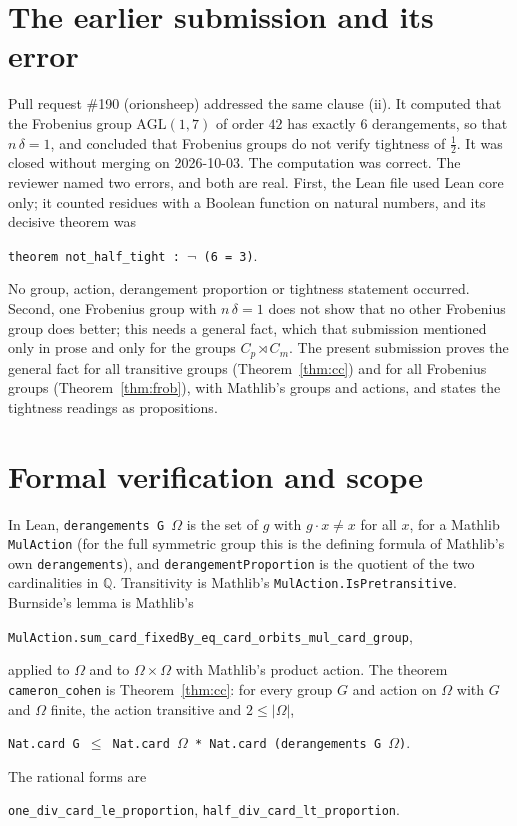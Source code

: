 \documentclass[11pt]{article}
\theoremstyle{remark}
\begin{document}
\section*{The earlier submission and its error}
Pull request \#190 (orionsheep) addressed the same clause (ii). It
computed that the Frobenius group $\mathrm{AGL}(1,7)$ of order $42$ has
exactly $6$ derangements, so that $n\,\delta=1$, and concluded that
Frobenius groups do not verify tightness of $\tfrac12$. It was closed
without merging on 2026-10-03. The computation was correct. The
reviewer named two errors, and both are real. First, the Lean file used
Lean core only; it counted residues with a Boolean function on natural
numbers, and its decisive theorem was
\begin{center}\small\texttt{theorem not\_half\_tight : $\neg$ (6 = 3)}.\end{center}
No group, action, derangement proportion or tightness statement
occurred. Second, one Frobenius group with $n\,\delta=1$ does not show
that no other Frobenius group does better; this needs a general fact,
which that submission mentioned only in prose and only for the groups
$C_p\rtimes C_m$. The present submission proves the general fact for
all transitive groups (Theorem~\ref{thm:cc}) and for all Frobenius
groups (Theorem~\ref{thm:frob}), with Mathlib's groups and actions, and
states the tightness readings as propositions.

\section*{Formal verification and scope}
In Lean, \texttt{derangements G $\Omega$} is the set of $g$ with
$g\cdot x\ne x$ for all $x$, for a Mathlib \texttt{MulAction} (for the
full symmetric group this is the defining formula of Mathlib's own
\texttt{derangements}), and
\texttt{derangementProportion} is the quotient of the two cardinalities
in $\mathbb Q$. Transitivity is Mathlib's
\texttt{MulAction.IsPretransitive}. Burnside's lemma is Mathlib's
\begin{center}\small
\texttt{MulAction.sum\_card\_fixedBy\_eq\_card\_orbits\_mul\_card\_group},
\end{center}
applied to $\Omega$ and to $\Omega\times\Omega$ with Mathlib's product
action. The theorem \texttt{cameron\_cohen} is Theorem~\ref{thm:cc}:
for every group $G$ and action on $\Omega$ with $G$ and $\Omega$ finite,
the action transitive and $2\le|\Omega|$,
\begin{center}\small
\texttt{Nat.card G $\le$ Nat.card $\Omega$ * Nat.card (derangements G $\Omega$)}.
\end{center}
The rational forms are
\begin{center}\small
\texttt{one\_div\_card\_le\_proportion},\qquad
\texttt{half\_div\_card\_lt\_proportion}.
\end{center}
\end{document}
